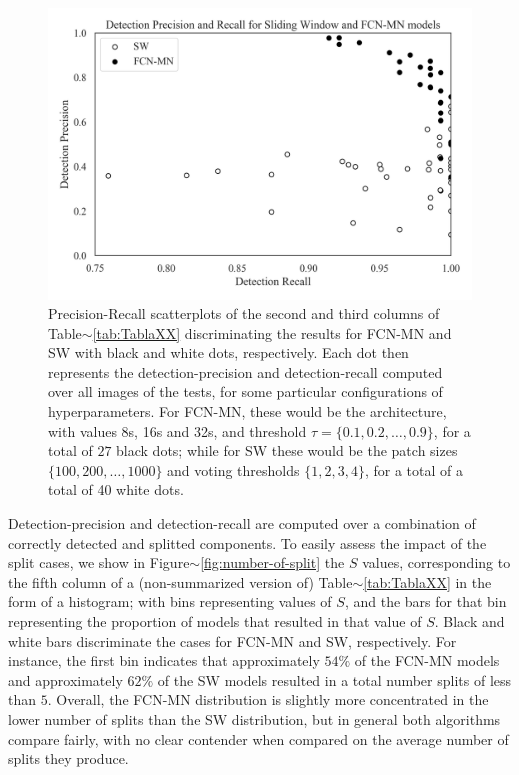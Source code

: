 \documentclass[a4paper,authoryear,review]{elsarticle}
\begin{document}
 \begin{figure}
    \centering
    \includegraphics[width=\textwidth]{figures/111_precision_recall_detection.png}
    \caption{Precision-Recall scatterplots of the second and third columns of Table$\sim$\ref{tab:TablaXX} discriminating the results for FCN-MN and SW with black and white dots, respectively. Each dot then  represents the detection-precision and detection-recall computed over all images of the tests, for some particular  configurations of hyperparameters. For FCN-MN, these would be the architecture, with values 8s, 16s and 32s, and threshold $\tau = \{0.1, 0.2, \ldots, 0.9\}$,  for a total of $27$ black dots; while for SW these would be the patch sizes  $\{100, 200, \ldots, 1000\}$ and voting thresholds $\{1, 2, 3, 4\}$, for a total of a total of 40 white dots.}
    \label{fig:detection-scatter-plot}
\end{figure}

 
Detection-precision and detection-recall are computed over a combination of correctly detected and splitted components. To easily assess the impact of the split cases, we show in Figure$\sim$\ref{fig:number-of-split} the $S$ values, corresponding to the fifth column of a   (non-summarized version of) Table$\sim$\ref{tab:TablaXX} in the form of a histogram; with bins representing values of $S$,  and the bars for that bin representing the proportion of models that resulted in that value of $S$. Black and white bars discriminate the cases for FCN-MN and SW, respectively. For instance, the first bin indicates that approximately $54\%$ of the FCN-MN models and approximately $62\%$ of the SW models resulted in a total number splits of less than $5$. Overall, the FCN-MN distribution is slightly more concentrated in the lower number of splits than the SW distribution, but in general both algorithms compare fairly, with no clear contender when compared on the average number of splits they produce. 
\end{document}
